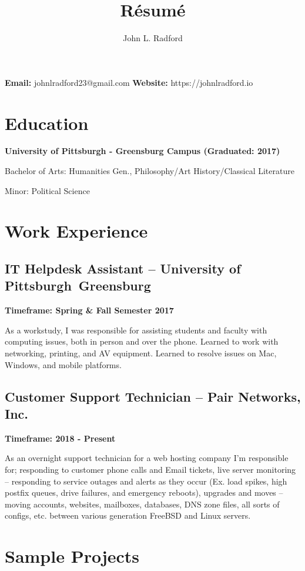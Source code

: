 \documentclass{article}
\makeatletter
\renewcommand{\maketitle}{
\begin{flushleft}
{\huge\bfseries
\theauthor}

\vspace{.25em}
\textbf{Email:} johnlradford23@gmail.com
\textbf{Website:} https://johnlradford.io 
\end{flushleft}
}
\makeatother
\begin{document}
\title{R\'esum\'e}
\author{John L. Radford}

\maketitle

\section{Education}

\noindent
\textbf{University of Pittsburgh - Greensburg Campus (Graduated: 2017)}

Bachelor of Arts: Humanities Gen., Philosophy/Art History/Classical Literature

Minor: Political Science

\section{Work Experience}

\subsection{IT Helpdesk Assistant -- University of Pittsburgh Greensburg}

\noindent
\textbf{Timeframe: Spring \& Fall Semester 2017}

As a workstudy, I was responsible for assisting students and faculty with
computing issues, both in person and over the phone. Learned to work with
networking, printing, and AV equipment. Learned to resolve issues on Mac,
Windows, and mobile platforms.

\subsection{Customer Support Technician -- Pair Networks, Inc.}

\noindent
\textbf{Timeframe: 2018 - Present}

As an overnight support technician for a web hosting company I'm responsible
for; responding to customer phone calls and Email tickets, live server
monitoring -- responding to service outages and alerts as they occur (Ex. load
spikes, high postfix queues, drive failures, and emergency reboots), upgrades
and moves -- moving accounts, websites, mailboxes, databases, DNS zone files,
all sorts of configs, etc. between various generation FreeBSD and Linux servers.

\section{Sample Projects}
\end{document}
